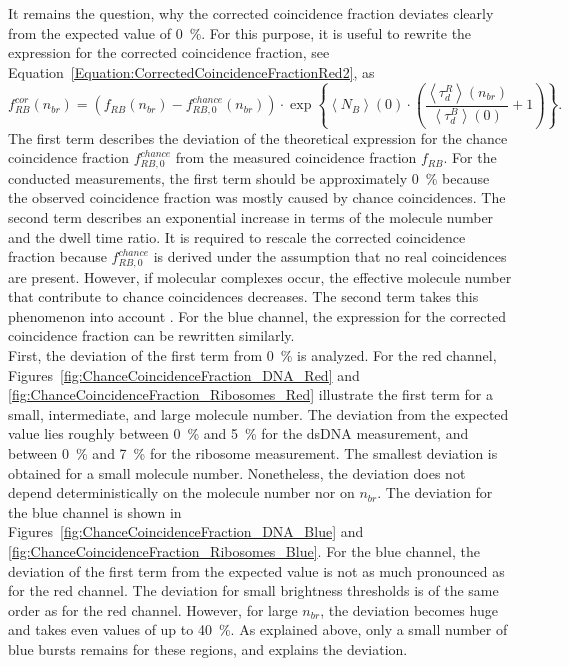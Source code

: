 It remains the question, why the corrected coincidence fraction deviates clearly from the expected value of \SI{0}{\percent}. For this purpose, it is useful to rewrite the expression for the corrected coincidence fraction, see Equation~\eqref{Equation:CorrectedCoincidenceFractionRed2}, as
\begin{equation} \label{Equation:ChanceCoincidenceCorrectionRewritten_Red}
	f_{RB}^{cor} (n_{br}) = \left(f_{RB}(n_{br}) - f_{RB,0}^{chance}(n_{br})\right) \cdot  \exp\left\{\left\langle N_B \right\rangle (0) \cdot \left(\frac{\left\langle \tau_d^R\right\rangle (n_{br})}{\left\langle \tau_d^B \right\rangle (0)} + 1\right)\right\}.
\end{equation}
The first term describes the deviation of the theoretical expression for the chance coincidence fraction $f_{RB,0}^{chance}$ from the measured coincidence fraction $f_{RB}$. For the conducted measurements, the first term should be approximately \SI{0}{\percent} because the observed coincidence fraction was mostly caused by chance coincidences. The second term describes an exponential increase in terms of the molecule number and the dwell time ratio. It is required to rescale the corrected coincidence fraction because $f_{RB,0}^{chance}$ is derived under the assumption that no real coincidences are present. However, if molecular complexes occur, the effective molecule number that contribute to chance coincidences decreases. The second term takes this phenomenon into account \cite{Hoefig2020}. For the blue channel, the expression for the corrected coincidence fraction can be rewritten similarly. \\
 
First, the deviation of the first term from \SI{0}{\percent} is analyzed. For the red channel, Figures~\ref{fig:ChanceCoincidenceFraction_DNA_Red} and \ref{fig:ChanceCoincidenceFraction_Ribosomes_Red} illustrate the first term for a small, intermediate, and large molecule number. The deviation from the expected value lies roughly between \SI{0}{\percent} and \SI{5}{\percent} for the \gls{dsDNA} measurement, and between \SI{0}{\percent} and \SI{7}{\percent} for the ribosome measurement. The smallest deviation is obtained for a small molecule number. Nonetheless, the deviation does not depend deterministically on the molecule number nor on $n_{br}$. The deviation for the blue channel is shown in Figures~\ref{fig:ChanceCoincidenceFraction_DNA_Blue} and \ref{fig:ChanceCoincidenceFraction_Ribosomes_Blue}. For the blue channel, the deviation of the first term from the expected value is not as much pronounced as for the red channel. The deviation for small brightness thresholds is of the same order as for the red channel. However, for large $n_{br}$, the deviation becomes huge and takes even values of up to \SI{40}{\percent}. As explained above, only a small number of blue bursts remains for these regions, and explains the deviation.\\

